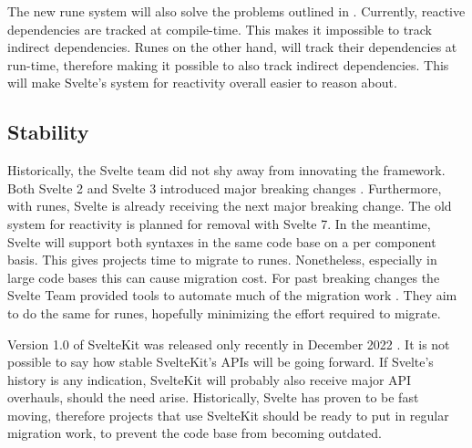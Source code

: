The new rune system will also solve the problems outlined in . Currently, reactive dependencies are tracked at compile-time. This makes it impossible to track indirect dependencies. Runes on the other hand, will track their dependencies at run-time, therefore making it possible to also track indirect dependencies. This will make Svelte's system for reactivity overall easier to reason about. 

\subsection{Stability}
\label{sec:evaluation-stability}
Historically, the Svelte team did not shy away from innovating the framework. Both Svelte 2 and Svelte 3 introduced major breaking changes \Cite{harris_svelte_2018,harris_svelte_2019}. Furthermore, with runes, Svelte is already receiving the next major breaking change. The old system for reactivity is planned for removal with Svelte 7. In the meantime, Svelte will support both syntaxes in the same code base on a per component basis. This gives projects time to migrate to runes. Nonetheless, especially in large code bases this can cause migration cost. For past breaking changes the Svelte Team provided tools to automate much of the migration work \cite{harris_svelte_2018}. They aim to do the same for runes, hopefully minimizing the effort required to migrate. 

Version 1.0 of SvelteKit was released only recently in December 2022 \cite{team_announcing_2022}. It is not possible to say how stable SvelteKit's APIs will be going forward. If Svelte's history is any indication, SvelteKit will probably also receive major API overhauls, should the need arise. Historically, Svelte has proven to be fast moving, therefore projects that use SvelteKit should be ready to put in regular migration work, to prevent the code base from becoming outdated.
